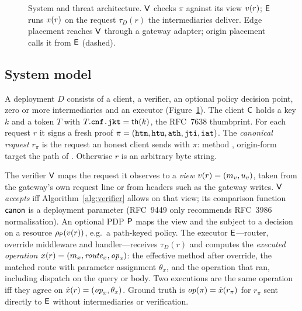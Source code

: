 \begin{figure}[t]
\caption{System and threat architecture. $\mathsf{V}$ checks $\pi$ against its view
$v(r)$; $\mathsf{E}$ runs $x(r)$ on the request $\tau_D(r)$ the intermediaries
deliver. Edge placement reaches $\mathsf{V}$ through a gateway adapter; origin
placement calls it from $\mathsf{E}$ (dashed).}
\label{fig:arch}
\end{figure}

\subsection{System model}\label{sec:model:system}

A deployment $D$ consists of a client, a verifier, an optional policy decision
point, zero or more intermediaries and an executor (Figure~\ref{fig:arch}).
The client $\mathsf{C}$ holds a key $k$ and a token $T$ with $T.\texttt{cnf.jkt}=\mathsf{th}(k)$,
the RFC~7638 thumbprint. For each request $r$ it signs a fresh proof
$\pi=(\texttt{htm},\texttt{htu},\texttt{ath},\texttt{jti},\texttt{iat})$. The \emph{canonical request} $r_\pi$ is the
request an honest client sends with $\pi$: method \htm, origin-form target the
path of \htu. Otherwise $r$ is an arbitrary byte string.

The verifier $\mathsf{V}$ maps the request it observes to a \emph{view}
$v(r)=(m_v,u_v)$, taken from the gateway's own request line or from headers
such as  the gateway writes. $\mathsf{V}$ \emph{accepts} iff
Algorithm~\ref{alg:verifier} allows on that view; its comparison function
$\mathsf{canon}$ is a deployment parameter (RFC~9449 only recommends RFC~3986
normalisation). An optional PDP $\mathsf{P}$ maps the view and the subject to a
decision on a resource $\rho_{\mathsf{P}}(v(r))$, e.g.\ a path-keyed policy.
The executor $\mathsf{E}$---router, override middleware and handler---receives
$\tau_D(r)$ and computes the \emph{executed operation}
$x(r)=(m_x,\mathit{route}_x,\mathit{op}_x)$: the effective method after override,
the matched route with parameter assignment $\theta_x$, and the operation that
ran, including dispatch on the query or body. Two executions are the same
operation iff they agree on $\hat{x}(r)=(\mathit{op}_x,\theta_x)$. Ground truth is
$\mathit{op}(\pi)=\hat{x}(r_\pi)$ for $r_\pi$ sent directly to $\mathsf{E}$ without
intermediaries or verification.

